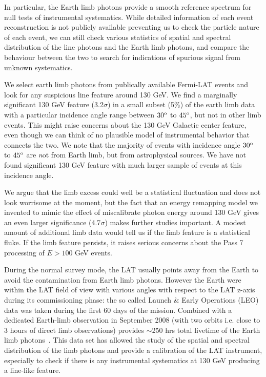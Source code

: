 \documentclass[aps,twocolumn,prd,superscriptaddress,showpacs,nofootinbib,fixfloat]{revtex4}
\newcommand{\degree}{^{\rm o}}
\begin{document}
In particular, the Earth limb photons provide a smooth
reference spectrum for null tests of instrumental
systematics. While detailed information of each event
reconstruction is not publicly available preventing us to
check the particle nature of each event, we can still check
various statistics of spatial and spectral distribution of
the line photons and the Earth limb photons, and compare the
behaviour between the two to search for indications of
spurious signal from unknown systematics.


We select earth limb photons from publically available
Fermi-LAT events and look for any suspicious line feature
around 130 GeV.  We find a marginally significant 130 GeV
feature (3.2$\sigma$) in a small subset (5\%) of the earth
limb data with a particular incidence angle range between
$30\degree$ to $45\degree$, but not in other limb events.  This
might raise concerns about the 130 GeV Galactic center
feature, even though we can think of no plausible model of
instrumental behavior that connects the two.  We note that
the majority of events with incidence angle $30\degree$ to
$45\degree$ are {\emph not} from Earth limb, but from
astrophysical sources. We have not found significant 130 GeV
feature with much larger sample of events at this incidence
angle.


We argue that the limb excess could well be a statistical
fluctuation and does not look worrisome at the moment, but
the fact that an energy remapping model we invented to mimic
the effect of miscalibrate photon energy around 130 GeV
gives an even larger significance (4.7$\sigma$) makes
further studies important. A modest amount of additional
limb data would tell us if the limb feature is a statistical
fluke.  If the limb feature persists, it raises serious
concerns about the Pass 7 processing of $E > 100$ GeV
events.

During the normal survey mode, the LAT usually points away
from the Earth to avoid the contamination from Earth limb
photons. However the Earth were within the LAT field of view
with various angles with respect to the LAT z-axis during
its commissioning phase: the so called Launch \& Early
Operations (LEO) data was taken during the first 60 days of
the mission. Combined with a dedicated Earth-limb
observation in September 2008 (with two orbits i.e. close to
3 hours of direct limb observations) provides $\sim$250 hrs
total livetime of the Earth limb
photons~\cite{FermiLimb}. This data set has allowed the
study of the spatial and spectral distribution of the limb
photons and provide a calibration of the LAT instrument,
especially to check if there is any instrumental systematics
at 130 GeV producing a line-like feature.
\end{document}
